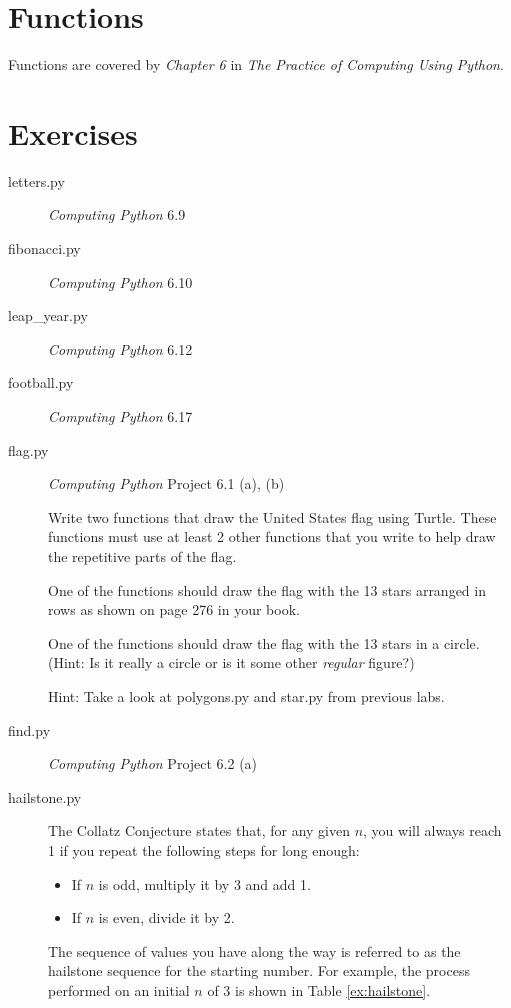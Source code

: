 \documentclass[11pt]{cselabheader}
\begin{document}
\section{Functions}

Functions are covered by \emph{Chapter 6} in \emph{The Practice of Computing
  Using Python}.

\section{Exercises}
\label{sec:ex}

\begin{description}
\item[letters.py] \emph{Computing Python} 6.9

\item[fibonacci.py] \emph{Computing Python} 6.10

\item[leap\_year.py] \emph{Computing Python} 6.12

\item[football.py] \emph{Computing Python} 6.17

\item[flag.py] \emph{Computing Python} Project 6.1 (a), (b) \hfill

  Write two functions that draw the United States flag using Turtle.
  These functions must use at least 2 other functions that you write
  to help draw the repetitive parts of the flag.

  One of the functions should draw the flag with the 13 stars arranged
  in rows as shown on page 276 in your book.

  One of the functions should draw the flag with the 13 stars in a circle.
  (Hint: Is it really a circle or is it some other \emph{regular} figure?)
  
  Hint: Take a look at polygons.py and star.py from previous labs.

\item[find.py] \emph{Computing Python} Project 6.2 (a)

\item[hailstone.py] The Collatz Conjecture states that, for any given $n$,
  you will always reach 1 if you repeat the following steps for long enough:
  \begin{itemize}
  \item If $n$ is odd, multiply it by 3 and add 1.
  \item If $n$ is even, divide it by 2.
  \end{itemize}
  The sequence of values you have along the way is referred to as the hailstone
  sequence for the starting number. For example, the process performed on an initial $n$ of 3 is shown in Table \ref{ex:hailstone}.


\end{description}
\end{document}
